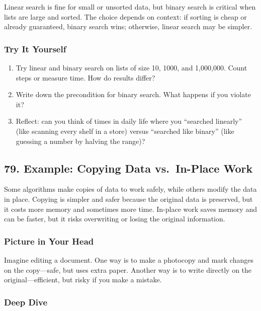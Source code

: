 \documentclass[
  letterpaper,
  DIV=11,
  numbers=noendperiod]{scrreprt}
\providecommand{\tightlist}{%
  \setlength{\itemsep}{0pt}\setlength{\parskip}{0pt}}
\begin{document}
Linear search is fine for small or unsorted data, but binary search is
critical when lists are large and sorted. The choice depends on context:
if sorting is cheap or already guaranteed, binary search wins;
otherwise, linear search may be simpler.

\subsubsection{Try It Yourself}\label{try-it-yourself-78}

\begin{enumerate}
\def\labelenumi{\arabic{enumi}.}
\tightlist
\item
  Try linear and binary search on lists of size 10, 1000, and 1,000,000.
  Count steps or measure time. How do results differ?
\item
  Write down the precondition for binary search. What happens if you
  violate it?
\item
  Reflect: can you think of times in daily life where you ``searched
  linearly'' (like scanning every shelf in a store) versus ``searched
  like binary'' (like guessing a number by halving the range)?
\end{enumerate}

\subsection{79. Example: Copying Data vs.~In-Place
Work}\label{example-copying-data-vs.-in-place-work}

Some algorithms make copies of data to work safely, while others modify
the data in place. Copying is simpler and safer because the original
data is preserved, but it costs more memory and sometimes more time.
In-place work saves memory and can be faster, but it risks overwriting
or losing the original information.

\subsubsection{Picture in Your Head}\label{picture-in-your-head-79}

Imagine editing a document. One way is to make a photocopy and mark
changes on the copy---safe, but uses extra paper. Another way is to
write directly on the original---efficient, but risky if you make a
mistake.

\subsubsection{Deep Dive}\label{deep-dive-49}
\end{document}
